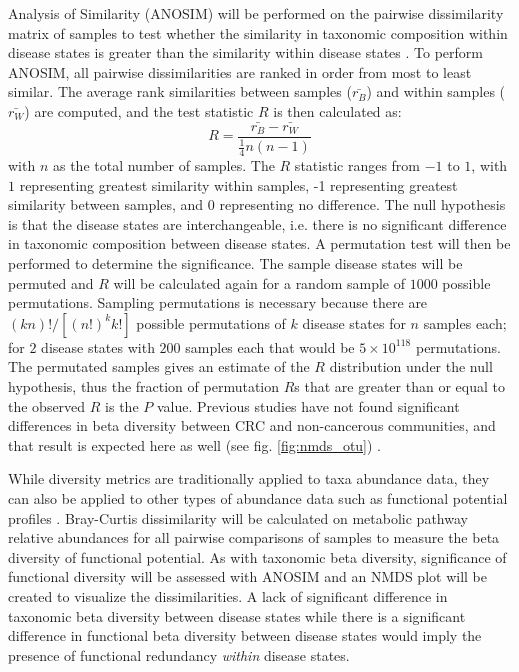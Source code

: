 \documentclass[11pt]{article}
\begin{document}
Analysis of Similarity (ANOSIM) will be performed on the pairwise dissimilarity matrix of samples to test whether the similarity in taxonomic composition within disease states is greater than the similarity within disease states \cite{clarke_non-parametric_1993}.
To perform ANOSIM, all pairwise dissimilarities are ranked in order from most to least similar.
The average rank similarities between samples ($\bar{r_B}$) and within samples ($\bar{r_W}$) are computed, and the test statistic $R$ is then calculated as:
$$R = \frac{ \bar{r_B} - \bar{r_W} }{ \frac{1}{4} n(n-1) }$$
with $n$ as the total number of samples.
The $R$ statistic ranges from $-1$ to $1$, with $1$ representing greatest similarity within samples, -1 representing greatest similarity between samples, and $0$ representing no difference.
The null hypothesis is that the disease states are interchangeable, i.e. there is no significant difference in taxonomic composition between disease states.
A permutation test will then be performed to determine the significance.
The sample disease states will be permuted and $R$ will be calculated again for a random sample of $1000$ possible permutations.
Sampling permutations is necessary because there are $(kn)!/[(n!)^k k!]$ possible permutations of $k$ disease states for $n$ samples each;
for $2$ disease states with $200$ samples each that would be $5 \times 10^{118}$ permutations.
The permutated samples gives an estimate of the $R$ distribution under the null hypothesis,
thus the fraction of permutation $R$s that are greater than or equal to the observed $R$ is the $P$ value.
Previous studies have not found significant differences in beta diversity between CRC and non-cancerous communities, and that result is expected here as well (see fig. \ref{fig:nmds_otu}) \cite{weir_stool_2013, hannigan_diagnostic_2018, topcuoglu_framework_2020}.

While diversity metrics are traditionally applied to taxa abundance data,
they can also be applied to other types of abundance data such as functional potential profiles \cite{franzosa_species-level_2018}.
Bray-Curtis dissimilarity will be calculated on metabolic pathway relative abundances for all pairwise comparisons of samples to measure the beta diversity of functional potential.
As with taxonomic beta diversity, significance of functional diversity will be assessed with ANOSIM and an NMDS plot will be created to visualize the dissimilarities.
A lack of significant difference in taxonomic beta diversity between disease states
while there is a significant difference in functional beta diversity between disease states
would imply the presence of functional redundancy \textit{within} disease states.
\end{document}
